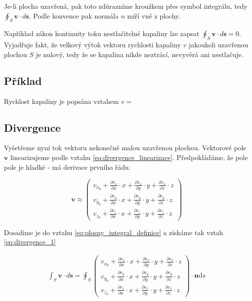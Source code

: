 \documentclass{book}
\newcommand{\vect}[1]{\boldsymbol{#1}}
\begin{document}
Je-li plocha uzavřená, pak toto zdůrazníme kroužkem přes symbol integrálu, tedy \(\oint_S \vect{v} \cdot d\vect{s}\). Podle konvence pak normála \(n\) míří vně z plochy.

Například zákon kontinuity toku nestlačitelné kapaliny lze zapsat \(\oint_S \vect{v} \cdot d\vect{s} = 0\). Vyjadřuje fakt, že velkový výtok vektoru rychlosti kapaliny \(v\) jakoukoli uzavřenou plochou \(S\) je nulový, tedy že se kapalina nikde neztrácí, nevyvěrá ani nestlačuje. 

\subsection{Příklad}

Rychlost kapaliny je popsána vztahem \(v = \)

\subsection{Divergence}
\label{sec:divergence}

Vyšetřeme nyní tok vektoru nekonečně malou uzavřenou plochou. Vektorové pole \(\vect{v}\) linearizujeme podle vztahu \eqref{eq:divergence_linearizace}.
Předpokládáme, že pole pole je hladké - má derivace prvního řádu.

\begin{equation}
\label{eq:divergence_linearizace}
\vect{v} \approx \begin{pmatrix}
v_{x_0} + \frac{\partial v_x}{\partial x} \cdot x + \frac{\partial v_x}{\partial y} \cdot y + \frac{\partial v_x}{\partial z} \cdot z \\
v_{y_0} + \frac{\partial v_y}{\partial x} \cdot x + \frac{\partial v_y}{\partial y} \cdot y + \frac{\partial v_y}{\partial z} \cdot z \\
v_{z_0} + \frac{\partial v_z}{\partial x} \cdot x + \frac{\partial v_z}{\partial y} \cdot y + \frac{\partial v_z}{\partial z} \cdot z
\end{pmatrix}
\end{equation}

Dosadíme je do vztahu \eqref{eq:plosny_integral_definice} a získáme tak vztah \eqref{eq:divergence_1}

\begin{equation}
\label{eq:divergence_1}
\begin{split}
\int_S \vect{v} \cdot d\vect{s} = \oint_S \begin{pmatrix}
v_{x_0} + \frac{\partial v_x}{\partial x} \cdot x + \frac{\partial v_x}{\partial y} \cdot y + \frac{\partial v_x}{\partial z} \cdot z \\
v_{y_0} + \frac{\partial v_y}{\partial x} \cdot x + \frac{\partial v_y}{\partial y} \cdot y + \frac{\partial v_y}{\partial z} \cdot z \\
v_{z_0} + \frac{\partial v_z}{\partial x} \cdot x + \frac{\partial v_z}{\partial y} \cdot y + \frac{\partial v_z}{\partial z} \cdot z
\end{pmatrix} \cdot \vect{n} \mathrm{d}s
\end{split}
\end{equation}
\end{document}
